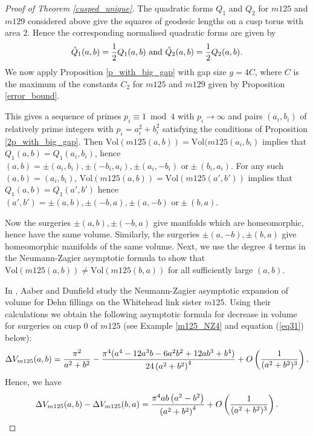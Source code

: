 \documentclass[reqno]{amsproc}  %
\def\vol{\text{Vol} }
\begin{document}
\begin{proof}[Proof of Theorem \ref{cusped_unique}]
The quadratic forms $Q_1$ and $Q_2$ for $m125$ and $m129$ considered  above
give the squares of geodesic lengths on a cusp torus with area $2$. Hence
the corresponding normalised quadratic forms are given by
$$\hat Q_1(a,b) =  {1 \over 2 } Q_1(a,b) \text{ and } \hat Q_2(a,b) =  {1 \over 2 } Q_2 (a,b).$$
We now apply Proposition \ref{p_with_big_gap} with gap size $g = 4 C$, where $C$ is the maximum of the 
constants $C_2$ for $m125$ and $m129$ given by Proposition \ref{error_bound}.  

This gives 
a sequence of primes $p_i \equiv 1 \bmod 4$ with $p_i \to \infty$ and pairs $(a_i,b_i)$ of relatively prime integers with
$p_i =a_i^2+b_i^2$ satisfying the conditions of Proposition \ref{2p_with_big_gap}.
Then
 $\vol(m125(a,b)) = \vol(m125(a_i,b_i)$ implies that
 $Q_1(a,b)=Q_1(a_i,b_i)$, hence   $(a,b) = \pm(a_i,b_i), \pm(-b_i,a_i), \pm(a_i,-b_i)  \text{ or} \pm(b_i,a_i)$.
 For any such $(a,b)=(a_i,b_i)$,
 $\vol(m125(a,b)) = \vol(m125(a',b'))$ implies that
 $Q_1(a,b)=Q_1(a',b')$ hence   $(a',b') = \pm(a, b), \pm(-b,a), \pm(a,-b)  \text{ or} \pm(b,a)$.
\fi

\smallskip
Now the surgeries $\pm(a, b), \pm(-b,a)$ give manifolds which are homeomorphic, hence have the same volume.
Similarly, the surgeries $ \pm(a,-b),   \pm(b,a)$ give homeomorphic manifolds of the same volume.
Next, we use the degree 4 terms in the Neumann-Zagier asymptotic formula
to show that $\vol(m125(a,b)) \ne  \vol (m125(b,a))$ for all sufficiently large $(a,b)$.

\smallskip
In \cite{AD}, Aaber and Dunfield study the Neumann-Zagier asymptotic expansion 
of volume for Dehn fillings on  the Whitehead link sister $m125$.
Using their calculations we obtain  the following asymptotic formula for decrease in volume
for surgeries on cusp 0 of $m125$ (see Example \ref{m125_NZ4} and equation (\ref{eq31}) below):
\begin{equation*}  
\Delta V_{m125} (a,b)=  
{ \pi^2 \over a^2+b^2} -
\frac{\pi^4(a^4-12 a^3 b-6 a^2 b^2+12 a b^3+b^4)}{ 24\left(a^2+b^2\right)^4}
+ O \left({1 \over (a^2+b^2)^3}\right).
\end{equation*} 
Hence, we have
\begin{equation}  \label{eq20}\Delta V_{m125} (a,b) - \Delta V_{m125} (b,a)
=  \frac{\pi ^4 a b \left(a^2-b^2\right)}{\left(a^2+b^2\right)^4} +
O \left({1 \over (a^2+b^2)^3}\right).
\end{equation} 


\end{proof}
\end{document}
